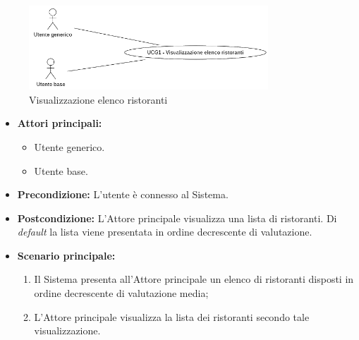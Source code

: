 
\label{usecase:Visualizzazione elenco ristoranti}

\begin{figure}[h]
	\centering
	\includegraphics[width=0.8\textwidth]{./uml/UCG1.png} 
	\caption{Visualizzazione elenco ristoranti}
	\label{fig:UCG1}
  \end{figure}

\begin{itemize}
	\item \textbf{Attori principali:} 
	\begin{itemize}
		\item Utente generico.
		\item Utente base.
	\end{itemize}

	\item \textbf{Precondizione:}
	      L'utente è connesso al Sistema.

	\item \textbf{Postcondizione:} L'Attore principale visualizza una lista di
	      ristoranti. Di \textit{default} la lista viene presentata in ordine decrescente di valutazione.

	\item \textbf{Scenario principale:}
	      \begin{enumerate}

		      \item Il Sistema presenta all'Attore principale un elenco di ristoranti disposti in ordine decrescente di valutazione media;

		      \item L'Attore principale visualizza la lista dei ristoranti secondo tale visualizzazione.

	      \end{enumerate}
\end{itemize}
